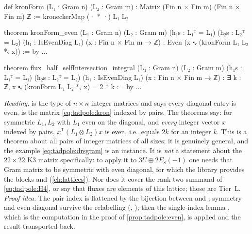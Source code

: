 \begin{leanbox}
\begin{leancode}
def kronForm (L₁ : Gram n) (L₂ : Gram m) :
    Matrix (Fin n × Fin m) (Fin n × Fin m) ℤ :=
  kroneckerMap (· * ·) L₁ L₂

theorem kronForm_even (L₁ : Gram n) (L₂ : Gram m)
    (h₁s : L₁ᵀ = L₁) (h₂s : L₂ᵀ = L₂)
    (h₁ : IsEvenDiag L₁) (x : Fin n × Fin m → ℤ) :
    Even (x ⬝ᵥ (kronForm L₁ L₂ *ᵥ x)) := by ...

theorem flux_half_selfIntersection_integral (L₁ : Gram n) (L₂ : Gram m)
    (h₁s : L₁ᵀ = L₁) (h₂s : L₂ᵀ = L₂) (h₁ : IsEvenDiag L₁)
    (x : Fin n × Fin m → ℤ) :
    ∃ k : ℤ, x ⬝ᵥ (kronForm L₁ L₂ *ᵥ x) = 2 * k := by ...
\end{leancode}
\emph{Reading.}  is the type of $n\times n$ integer matrices and
 says every diagonal entry is even.  is the matrix
\eqref{eq:tadpole:kron} indexed by pairs. The theorems say: for symmetric $L_1,L_2$ with $L_1$
even on the diagonal, and \emph{every} integer vector $x$ indexed by pairs,
$x^{\mathsf T}(L_1\otimes L_2)x$ is even, i.e.\ equals $2k$ for an integer $k$. This is a
theorem about all pairs of integer matrices of all sizes; it is genuinely general, and the
example \eqref{eq:tadpole:drsgram} is an instance. It is \emph{not} a statement about the
$22\times22$ K3 matrix specifically: to apply it to $3U\oplus2E_8(-1)$ one needs that Gram
matrix to be symmetric with even diagonal, for which the library provides the blocks
 and  (\cref{ch:lattices}). Nor does it
cover the rank-two summand of \eqref{eq:tadpole:H4}, or say that fluxes are elements of this
lattice; those are Tier~L. \emph{Proof idea.} The pair index is flattened by the bijection
 between  and ; symmetry and even
diagonal survive the relabelling (, ); then the
single-index lemma , which is the computation in
the proof of \cref{prop:tadpole:even}, is applied and the result transported back.
\end{leanbox}

